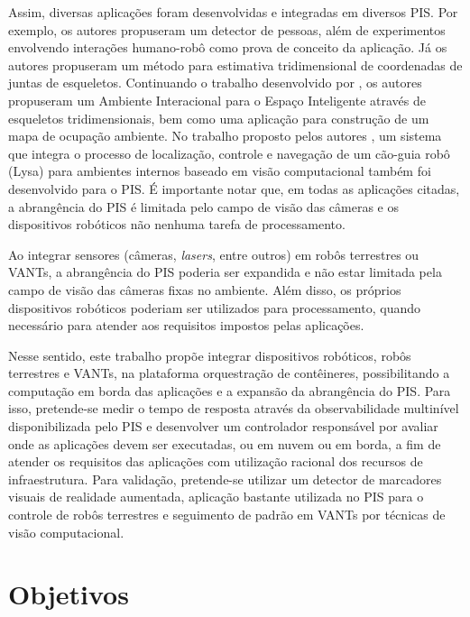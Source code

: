 Assim, diversas aplicações foram desenvolvidas e integradas em diversos PIS. Por exemplo, os autores  propuseram um detector de pessoas, além de experimentos envolvendo interações humano-robô como prova de conceito da aplicação. Já os autores  propuseram um método para estimativa tridimensional de coordenadas de juntas de esqueletos. Continuando o trabalho desenvolvido por , os autores  propuseram um Ambiente Interacional para o Espaço Inteligente através de esqueletos tridimensionais, bem como uma aplicação para construção de um mapa de ocupação ambiente. No trabalho proposto pelos autores , um sistema que integra o processo de localização, controle e navegação de um cão-guia robô (Lysa) para ambientes internos baseado em visão computacional também foi desenvolvido para o PIS. É importante notar que, em todas as aplicações citadas, a abrangência do PIS é limitada pelo campo de visão das câmeras e os dispositivos robóticos não  nenhuma tarefa de processamento.  

Ao integrar sensores (câmeras, \textit{lasers}, entre outros) em robôs terrestres ou VANTs, a abrangência do PIS poderia ser expandida e não estar limitada pela campo de visão das câmeras fixas no ambiente. Além disso, os próprios dispositivos robóticos poderiam ser utilizados para processamento, quando necessário para atender aos requisitos impostos pelas aplicações.

Nesse sentido, este trabalho propõe integrar dispositivos robóticos, robôs terrestres e VANTs, na plataforma orquestração de contêineres, possibilitando a computação em borda das aplicações e a expansão da abrangência do PIS. Para isso, pretende-se medir o tempo de resposta através da observabilidade multinível disponibilizada pelo PIS e desenvolver um controlador responsável por avaliar onde as aplicações devem ser executadas, ou em nuvem ou em borda, a fim de atender os requisitos das aplicações com utilização racional dos recursos de infraestrutura. Para validação, pretende-se utilizar um detector de marcadores visuais de realidade aumentada, aplicação bastante utilizada no PIS para o controle de robôs terrestres e seguimento de padrão em VANTs por técnicas de visão computacional.


\section{Objetivos}

